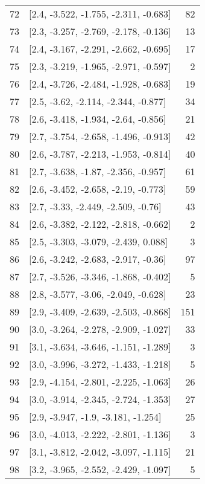 \documentclass{article}%
\begin{document}
\begin{longtable}{llr}
72  &  [2.4, -3.522, -1.755, -2.311, -0.683] &      82 \\
73  &  [2.3, -3.257, -2.769, -2.178, -0.136] &      13 \\
74  &  [2.4, -3.167, -2.291, -2.662, -0.695] &      17 \\
75  &  [2.3, -3.219, -1.965, -2.971, -0.597] &       2 \\
76  &  [2.4, -3.726, -2.484, -1.928, -0.683] &      19 \\
77  &   [2.5, -3.62, -2.114, -2.344, -0.877] &      34 \\
78  &   [2.6, -3.418, -1.934, -2.64, -0.856] &      21 \\
79  &  [2.7, -3.754, -2.658, -1.496, -0.913] &      42 \\
80  &  [2.6, -3.787, -2.213, -1.953, -0.814] &      40 \\
81  &   [2.7, -3.638, -1.87, -2.356, -0.957] &      61 \\
82  &   [2.6, -3.452, -2.658, -2.19, -0.773] &      59 \\
83  &    [2.7, -3.33, -2.449, -2.509, -0.76] &      43 \\
84  &  [2.6, -3.382, -2.122, -2.818, -0.662] &       2 \\
85  &   [2.5, -3.303, -3.079, -2.439, 0.088] &       3 \\
86  &   [2.6, -3.242, -2.683, -2.917, -0.36] &      97 \\
87  &  [2.7, -3.526, -3.346, -1.868, -0.402] &       5 \\
88  &   [2.8, -3.577, -3.06, -2.049, -0.628] &      23 \\
89  &  [2.9, -3.409, -2.639, -2.503, -0.868] &     151 \\
90  &  [3.0, -3.264, -2.278, -2.909, -1.027] &      33 \\
91  &  [3.1, -3.634, -3.646, -1.151, -1.289] &       3 \\
92  &  [3.0, -3.996, -3.272, -1.433, -1.218] &       5 \\
93  &  [2.9, -4.154, -2.801, -2.225, -1.063] &      26 \\
94  &  [3.0, -3.914, -2.345, -2.724, -1.353] &      27 \\
95  &    [2.9, -3.947, -1.9, -3.181, -1.254] &      25 \\
96  &  [3.0, -4.013, -2.222, -2.801, -1.136] &       3 \\
97  &  [3.1, -3.812, -2.042, -3.097, -1.115] &      21 \\
98  &  [3.2, -3.965, -2.552, -2.429, -1.097] &       5 \\

\end{longtable}
\end{document}
